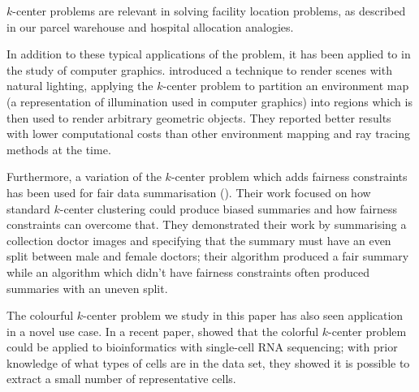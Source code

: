 $k$-center problems are relevant in solving facility location problems, as described in our parcel warehouse and hospital allocation analogies. 

In addition to these typical applications of the problem, it has been applied to in the study of computer graphics. \textcite{agarwal_structured_2003} introduced a technique to render scenes with natural lighting, applying the $k$-center problem to partition an environment map (a representation of illumination used in computer graphics) into regions which is then used to render arbitrary geometric objects. They reported better results with lower computational costs than other environment mapping and ray tracing methods at the time.

Furthermore, a variation of the $k$-center problem which adds fairness constraints has been used for fair data summarisation (\cite{kleindessner_fair_2019}). Their work focused on how standard $k$-center clustering could produce biased summaries and how fairness constraints can overcome that. They demonstrated their work by summarising a collection doctor images and specifying that the summary must have an even split between male and female doctors; their algorithm produced a fair summary while an algorithm which didn't have fairness constraints often produced summaries with an uneven split. 

The colourful $k$-center problem we study in this paper has also seen application in a novel use case. In a recent paper, \textcite{do_sphetcher_2020} showed that the colorful $k$-center problem could be applied to bioinformatics with single-cell RNA sequencing; with prior knowledge of what types of cells are in the data set, they showed it is possible to extract a small number of representative cells.